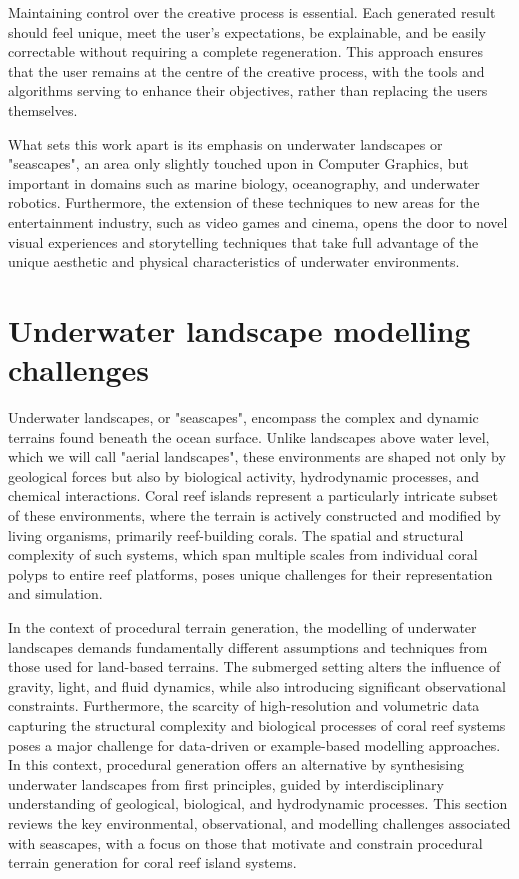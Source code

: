 Maintaining control over the creative process is essential. Each generated result should feel unique, meet the user's expectations, be explainable, and be easily correctable without requiring a complete regeneration. This approach ensures that the user remains at the centre of the creative process, with the tools and algorithms serving to enhance their objectives, rather than replacing the users themselves.

What sets this work apart is its emphasis on underwater landscapes or "seascapes", an area only slightly touched upon in Computer Graphics, but important in domains such as marine biology, oceanography, and underwater robotics. Furthermore, the extension of these techniques to new areas for the entertainment industry, such as video games and cinema, opens the door to novel visual experiences and storytelling techniques that take full advantage of the unique aesthetic and physical characteristics of underwater environments.




\section{Underwater landscape modelling challenges}
Underwater landscapes, or "seascapes", encompass the complex and dynamic terrains found beneath the ocean surface. Unlike landscapes above water level, which we will call "aerial landscapes", these environments are shaped not only by geological forces but also by biological activity, hydrodynamic processes, and chemical interactions. Coral reef islands represent a particularly intricate subset of these environments, where the terrain is actively constructed and modified by living organisms, primarily reef-building corals. The spatial and structural complexity of such systems, which span multiple scales from individual coral polyps to entire reef platforms, poses unique challenges for their representation and simulation.

In the context of procedural terrain generation, the modelling of underwater landscapes demands fundamentally different assumptions and techniques from those used for land-based terrains. The submerged setting alters the influence of gravity, light, and fluid dynamics, while also introducing significant observational constraints. Furthermore, the scarcity of high-resolution and volumetric data capturing the structural complexity and biological processes of coral reef systems poses a major challenge for data-driven or example-based modelling approaches. In this context, procedural generation offers an alternative by synthesising underwater landscapes from first principles, guided by interdisciplinary understanding of geological, biological, and hydrodynamic processes. This section reviews the key environmental, observational, and modelling challenges associated with seascapes, with a focus on those that motivate and constrain procedural terrain generation for coral reef island systems.


